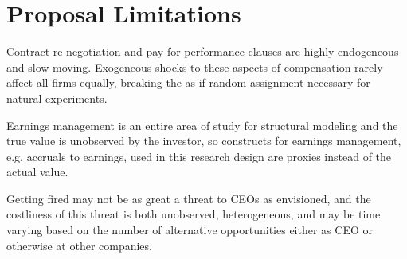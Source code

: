 \documentclass{article}
\begin{document}
\section{Proposal Limitations}
Contract re-negotiation and pay-for-performance clauses are highly endogeneous and slow moving. Exogeneous shocks to these aspects of compensation rarely affect all firms equally, breaking the as-if-random assignment necessary for natural experiments.
\par Earnings management is an entire area of study for structural modeling and the true value is unobserved by the investor, so constructs for earnings management, e.g. accruals to earnings, used in this research design are proxies instead of the actual value.
\par Getting fired may not be as great a threat to CEOs as envisioned, and the costliness of this threat is both unobserved, heterogeneous, and may be time varying based on the number of alternative opportunities either as CEO or otherwise at other companies.

\end{document}
